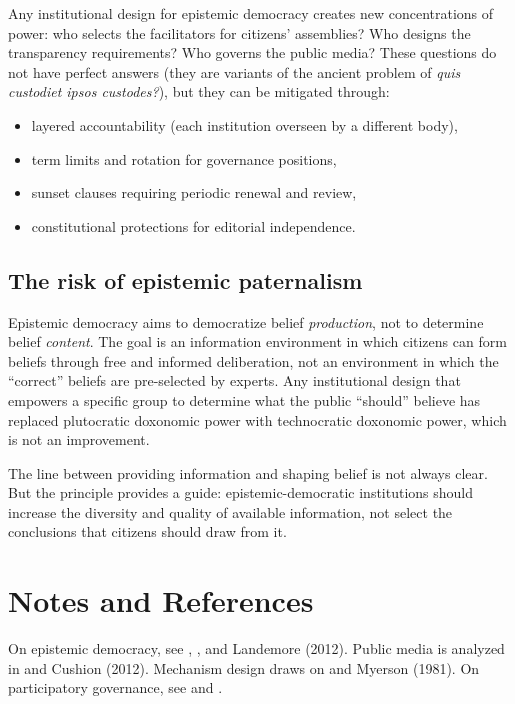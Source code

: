 Any institutional design for epistemic democracy creates new concentrations of power: who selects the facilitators for citizens' assemblies? Who designs the transparency requirements? Who governs the public media?
These questions do not have perfect answers (they are variants of the ancient problem of \emph{quis custodiet ipsos custodes?}), but they can be mitigated through:
\begin{itemize}[nosep]
  \item layered accountability (each institution overseen by a different body),
  \item term limits and rotation for governance positions,
  \item sunset clauses requiring periodic renewal and review,
  \item constitutional protections for editorial independence.
\end{itemize}

\subsection{The risk of epistemic paternalism}

\begin{principle}
\label{prin:anti-paternalism}
Epistemic democracy aims to democratize belief \emph{production}, not to determine belief \emph{content}.
The goal is an information environment in which citizens can form beliefs through free and informed deliberation, not an environment in which the ``correct'' beliefs are pre-selected by experts.
Any institutional design that empowers a specific group to determine what the public ``should'' believe has replaced plutocratic doxonomic power with technocratic doxonomic power, which is not an improvement.
\end{principle}

The line between providing information and shaping belief is not always clear.
But the principle provides a guide: epistemic-democratic institutions should increase the diversity and quality of available information, not select the conclusions that citizens should draw from it.

\section{Notes and References}
\label{sec:ch32-notes}

On epistemic democracy, see \textcite{dewey1927}, \textcite{habermas1962}, and Landemore (2012).
Public media is analyzed in \textcite{mcchesney1999} and Cushion (2012).
Mechanism design draws on \textcite{arrow1963} and Myerson (1981).
On participatory governance, see \textcite{ostrom1990} and \textcite{wright2010}.

